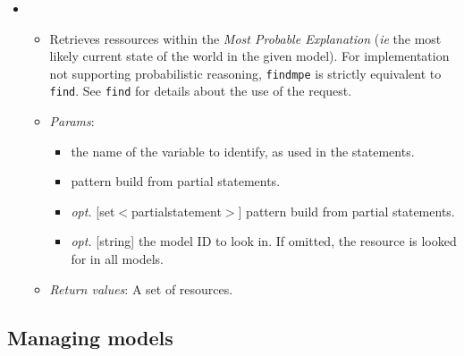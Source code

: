\begin{itemize}
\item  {}
\begin{itemize}
\item  Retrieves ressources within the \emph{Most Probable Explanation} (\emph{ie} the most likely current state of the world in the given model). For implementation not supporting probabilistic reasoning, \texttt{findmpe} is strictly equivalent to \texttt{find}. See \texttt{find} for details about the use of the request.
\item  \emph{Params}:
\begin{itemize}
\item  [string] the name of the variable to identify, as used in the statements.
\item  [set$<$partial{\textunderscore}statement$>$] pattern build from partial statements.
\item  \emph{opt.} [set$<$partial{\textunderscore}statement$>$] pattern build from partial statements.
\item  \emph{opt.} [string] the model ID to look in. If omitted, the resource is looked for in all models. 
\end{itemize}

\item  \emph{Return values}: A set of resources.
\end{itemize}

\end{itemize}

\subsection{Managing models}


